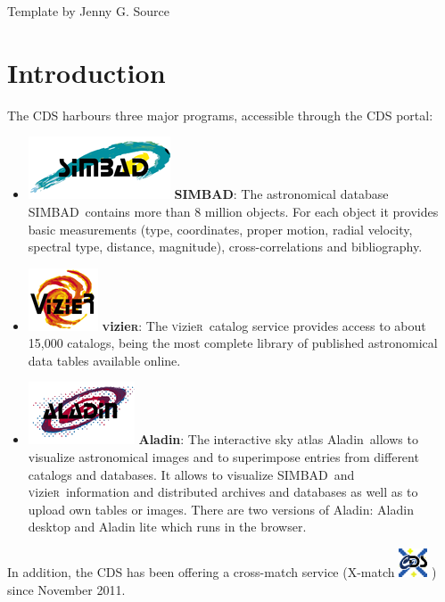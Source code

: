 \documentclass [a4paper, 12pt]{article}
\newcommand{\aladin}{{\textsc{A}{ladin}}}
\newcommand{\simbad}{{\textsc{SIMBAD}}}
\newcommand{\vizier}{{\textsc{v}izie\textsc{r}}}
\begin{document}
\vspace{3.5cm}
Template by Jenny G. Source


\newpage
\normalsize
\vfill
\tableofcontents
\vfill

\newpage

\justify
\section{Introduction}

The CDS harbours three major programs, accessible through the CDS portal:\\
\begin{itemize}
\item \includegraphics[width=0.1 \textwidth]{../images/logo_simbad.png} 
\textbf{\simbad}: The astronomical database \simbad\ contains more than 
8 million objects. For each object it provides basic measurements (type, 
coordinates, proper motion, radial velocity, spectral type, distance, 
magnitude), cross-correlations and bibliography.
\item \includegraphics[width=0.08  \textwidth]{../images/logo_vizier.png}  
\textbf{\vizier}: The \vizier\ catalog service provides access to about 
15,000 catalogs, being the most complete library of published astronomical 
data tables available online.
\item \includegraphics[width=0.1  \textwidth]{../images/logo_aladin.png} 
\textbf{\aladin}: The interactive sky atlas \aladin\ allows to 
visualize astronomical images and to superimpose entries from different 
catalogs and databases. It allows to visualize \simbad\ and \vizier\ 
information and distributed archives and databases as well as to upload own 
tables or images. There are two versions of \aladin: Aladin desktop and Aladin 
lite which runs in the browser.
\end{itemize}

In addition, the CDS has been offering a cross-match service 
(X-match \includegraphics[width=0.03 
\textwidth]{../images/logo_cds_xmatch.png} ) since November 2011. 
\end{document}
